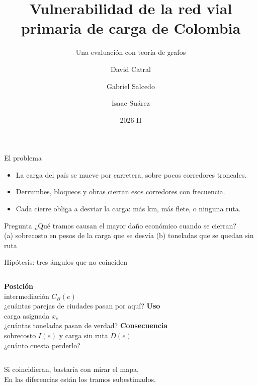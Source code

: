 \documentclass[aspectratio=169, 11pt]{beamer}
\title{Vulnerabilidad de la red vial primaria de carga de Colombia}
\subtitle{Una evaluación con teoría de grafos}
\author{David Catral \and Gabriel Salcedo \and Isaac Suárez}
\institute{Teoría de Grafos · Universidad del Rosario}
\date{2026-II}
\begin{document}
\begin{frame}
  \titlepage
\end{frame}

\begin{frame}{El problema}
  \begin{itemize}
    \item La carga del país se mueve por carretera, sobre pocos corredores troncales.
    \item Derrumbes, bloqueos y obras cierran esos corredores con frecuencia.
    \item Cada cierre obliga a desviar la carga: más km, más flete, o ninguna ruta.
  \end{itemize}
  \vspace{1.2em}
  \begin{block}{Pregunta}
    ¿Qué tramos causan el mayor daño económico cuando se cierran?\\[0.3em]
    \small (a) sobrecosto en pesos de la carga que se desvía \quad
    (b) toneladas que se quedan sin ruta
  \end{block}
\end{frame}

\begin{frame}{Hipótesis: tres ángulos que no coinciden}
  \begin{columns}[T]
    \centering
      {\Large\bfseries\color{azul}Posición}\\[0.4em]
      intermediación $C_B(e)$\\[0.2em]
      \small ¿cuántas parejas de ciudades pasan por aquí?
    \centering
      {\Large\bfseries\color{azul}Uso}\\[0.4em]
      carga asignada $x_e$\\[0.2em]
      \small ¿cuántas toneladas pasan de verdad?
    \centering
      {\Large\bfseries\color{naranja}Consecuencia}\\[0.4em]
      sobrecosto $I(e)$ y carga sin ruta $D(e)$\\[0.2em]
      \small ¿cuánto cuesta perderlo?
  \end{columns}
  \vspace{2em}
  \centering
  Si coincidieran, bastaría con mirar el mapa.\\
  \alert{En las diferencias están los tramos subestimados.}
\end{frame}
\end{document}
